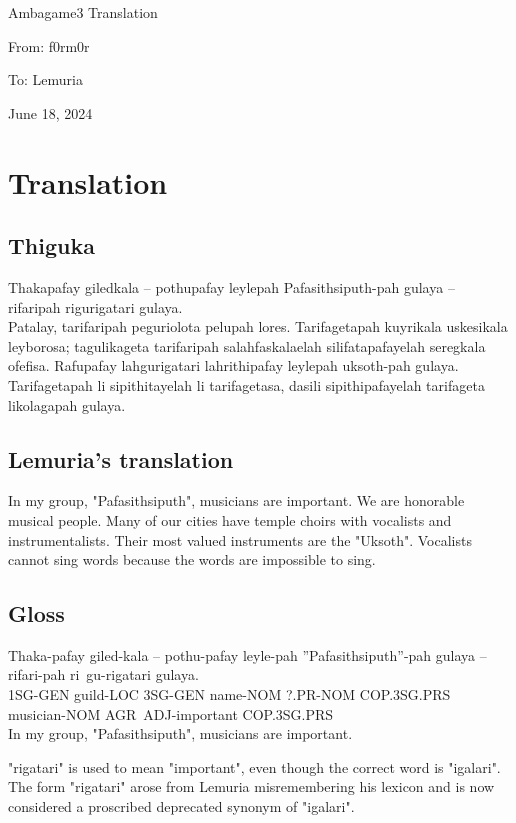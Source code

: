 \documentclass{thiguka}
\begin{document}
Ambagame3 Translation

From: f0rm0r

To: Lemuria

June 18, 2024

\section{Translation}
\subsection{Thiguka}
Thakapafay giledkala -- pothupafay leylepah Pafasithsiputh-pah gulaya -- rifaripah rigurigatari gulaya.\\
Patalay, tarifaripah peguriolota pelupah lores.
Tarifagetapah kuyrikala uskesikala leyborosa; tagulikageta tarifaripah salahfaskalaelah silifatapafayelah seregkala ofefisa.
Rafupafay lahgurigatari lahrithipafay leylepah uksoth-pah gulaya.
Tarifagetapah li sipithitayelah li tarifagetasa, dasili sipithipafayelah tarifageta likolagapah gulaya.

\subsection{Lemuria's translation}
In my group, "Pafasithsiputh", musicians are important.
We are honorable musical people.
Many of our cities have temple choirs with vocalists and instrumentalists.
Their most valued instruments are the "Uksoth".
Vocalists cannot sing words because the words are impossible to sing.

\subsection{Gloss}
\begin{exe}
    \ex{} \gll{}Thaka-pafay giled-kala -- pothu-pafay leyle-pah ''Pafasithsiputh''-pah gulaya -- rifari-pah ri~gu-rigatari gulaya.\\
               1SG-GEN guild-LOC {} 3SG-GEN name-NOM ?.PR-NOM COP.3SG.PRS {} musician-NOM AGR~ADJ-important COP.3SG.PRS\\
          \glt{}In my group, "Pafasithsiputh", musicians are important.
\end{exe}

"rigatari" is used to mean "important", even though the correct word is "igalari". The form "rigatari" arose from Lemuria misremembering his lexicon and is now considered a proscribed deprecated synonym of "igalari".
\end{document}
